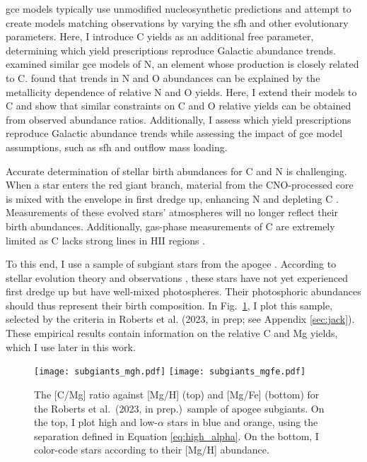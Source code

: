 \documentclass[12pt,oneside,letterpaper]{report}
\newcommand{\sfh}{\gls{sfh}}
\newcommand{\gce}{\gls{gce}}
\newcommand{\Gce}{\Gls{gce}}
\newcommand{\apogee}{\gls{apogee}}
\newcommand{\citetjack}{Roberts et al.~(2023, in prep.)}
\begin{document}
\Gce{} models typically use unmodified nucleosynthetic predictions and attempt to create models matching observations by varying the \sfh{} and other evolutionary parameters. Here, I introduce C yields as an additional free parameter, determining which yield prescriptions reproduce Galactic abundance trends.
\cite{james+23} examined similar \gce{} models of N, an element whose production is closely related to C. \cite{james+23} found that trends in N and O abundances can be explained by the metallicity dependence of relative N and O yields. Here, I extend their models to C and show that similar constraints on C and O relative yields can be obtained from observed abundance ratios. Additionally, I assess which yield prescriptions reproduce Galactic abundance trends while assessing the impact of \gce{} model assumptions, such as \sfh{} and outflow mass loading.

Accurate determination of stellar birth abundances for C and N is challenging. When a star enters the red giant branch, material from the CNO-processed core is mixed with the envelope in first dredge up, enhancing N and depleting C \citep{iben67, vincenzo+21,KL14}. Measurements of these evolved stars'  atmospheres will no longer reflect their birth abundances.  Additionally, gas-phase measurements of C are extremely limited as C lacks strong lines in HII regions \citep{skillman+20}.

To this end, I use a sample of subgiant stars from the \apogee{} \citep{apogee17}. According to stellar evolution theory and observations \citep{gilroy89, korn+07, lind+08, souto+18, souto19}, these stars have not yet experienced first dredge up but have well-mixed photospheres. Their photosphoric abundances should thus represent their birth composition.  In Fig.~\ref{fig:subgiants}, I plot this sample, selected by the criteria in Roberts et al. (2023, in prep; see Appendix \ref{sec:jack}). These empirical results contain information on the relative C and Mg yields, which I use later in this work.

\begin{figure}[htp]
    \texttt{[image: subgiants\_mgh.pdf]}
    \texttt{[image: subgiants\_mgfe.pdf]}
    \caption[APOGEE Subgiants]{The [C/Mg] ratio against [Mg/H] (top) and [Mg/Fe] (bottom) for the \citetjack~sample of \apogee{} subgiants. On the top, I plot high and low-$\alpha$ stars in blue and orange, using the separation defined in Equation \ref{eq:high_alpha}. On the bottom, I color-code stars according to their [Mg/H] abundance.}
    \label{fig:subgiants}
\end{figure}
\end{document}
